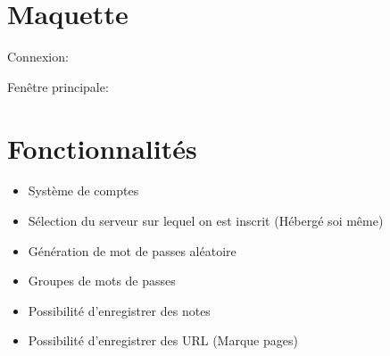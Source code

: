 \documentclass[oneside]{report}
\begin{document}
	\section{Maquette}
	{
		\par Connexion:\\
		\noindent{}
		\par Fenêtre principale:\\
		\noindent{}
	}

	\section{Fonctionnalités}
	{
		\begin{itemize}
			\item Système de comptes
			\item Sélection du serveur sur lequel on est inscrit (Hébergé soi même)
			\item Génération de mot de passes aléatoire
			\item Groupes de mots de passes
			\item Possibilité d'enregistrer des notes
			\item Possibilité d'enregistrer des URL (Marque pages)
		\end{itemize}
	}
\end{document}

